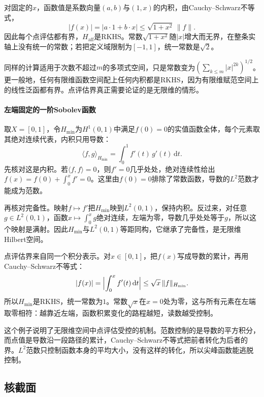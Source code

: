 对固定的$x$，函数值是系数向量$(a,b)$与$(1,x)$的内积，由Cauchy--Schwarz不等式，
\[
\lvert f(x)\rvert=\lvert a\cdot1+b\cdot x\rvert\leq\sqrt{1+x^2}\,\lVert f\rVert .
\]
因此每个点评估都有界，$H_{\mathrm{aff}}$是RKHS。常数$\sqrt{1+x^2}$随$\lvert x\rvert$增大而无界，在整条实轴上没有统一的常数；若把定义域限制为$[-1,1]$，统一常数是$\sqrt2$。

同样的计算适用于次数不超过$m$的多项式空间，只是常数变为$(\sum_{k\leq m}\lvert x\rvert^{2k})^{1/2}$。更一般地，任何有限维函数空间配上任何内积都是RKHS，因为有限维赋范空间上的线性泛函都有界。点评估界真正需要论证的是无限维的情形。

\paragraph{左端固定的一阶Sobolev函数}

取$X=[0,1]$，令$H_{\min}$为$H^1(0,1)$中满足$f(0)=0$的实值函数全体，每个元素取其绝对连续代表，内积只用导数：
\[
\langle f,g\rangle_{H_{\min}}=\int_0^1f'(t)\,g'(t)\,\mathrm dt .
\]
先核对这是内积。若$\langle f,f\rangle=0$，则$f'=0$几乎处处，绝对连续性给出$f(x)=f(0)+\int_0^xf'=0$。这里由$f(0)=0$排除了常数函数，导数的$L^2$范数才能成为范数。

再核对完备性。映射$f\mapsto f'$把$H_{\min}$映到$L^2(0,1)$，保持内积。反过来，对任意$g\in L^2(0,1)$，函数$x\mapsto\int_0^xg$绝对连续，左端为零，导数几乎处处等于$g$，所以这个映射是满射。因此$H_{\min}$与$L^2(0,1)$等距同构，它继承了完备性，是无限维Hilbert空间。

点评估界来自同一个积分表示。对$x\in[0,1]$，把$f(x)$写成导数的累计，再用Cauchy--Schwarz不等式：
\begin{equation}
\lvert f(x)\rvert=\Bigl\lvert\int_0^xf'(t)\,\mathrm dt\Bigr\rvert
\leq\sqrt x\,\lVert f\rVert_{H_{\min}} .
\label{eq:rkhs-hmin-point-bound}
\end{equation}
所以$H_{\min}$是RKHS，统一常数为$1$。常数$\sqrt x$在$x=0$处为零，这与所有元素在左端取零相符：越靠近左端，函数积累变化的路程越短，读数越受控制。

这个例子说明了无限维空间中点评估受控的机制。范数控制的是导数的平方积分，而点值是导数沿一段路径的累计，Cauchy--Schwarz不等式把前者转化为后者的界。$L^2$范数只控制函数本身的平均大小，没有这样的转化，所以尖峰函数能逃脱控制。

\subsection{核截面}
\label{sec:rkhs-kernel-sections}

